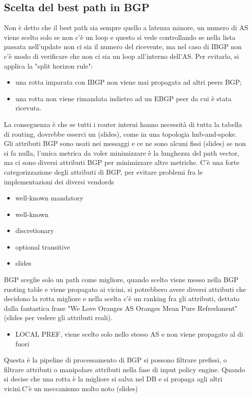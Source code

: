 \documentclass[12pt, oneside]{extbook} %
\begin{document}
\subsection{Scelta del best path in BGP}
Non è detto che il best path sia sempre quello a latenza minore, un numero di AS viene scelto solo se non c'è un loop e questo si vede controllando se nella lista passata nell'update non ci sia il numero del ricevente, ma nel caso di IBGP non c'è modo di verificare che non ci sia un loop all'interno dell'AS. Per evitarlo, si applica la "split horizon rule":
\begin{itemize}
\item una rotta imparata con IBGP non viene mai propagata ad altri peers BGP;
\item una rotta non viene rimandata indietro ad un EBGP peer da cui è stata ricevuta.
\end{itemize}
La conseguenza è che se tutti i router interni hanno necessità di tutta la tabella di routing, dovrebbe esserci un (slides), come in una topologia hub-and-spoke.\\Gli attributi BGP sono usati nei messaggi e ce ne sono alcuni fissi
(slides)
se non si fa nulla, l'unica metrica da voler minimizzare è la lunghezza del path vector, ma ci sono diversi attributi BGP per minimizzare altre metriche. C'è una forte categorizzazione degli attributi di BGP, per evitare problemi fra le implementazioni dei diversi vendords
\begin{itemize}
\item well-known mandatory
\item well-known
\item discretionary
\item optional transitive
\item slides
\end{itemize}
BGP sceglie solo un path come migliore, quando scelto viene messo nella BGP ruoting table e viene propagato ai vicini, si potrebbero avere diversi attributi che decidono la rotta migliore e nella scelta c'è un ranking fra gli attributi, dettato dalla fantastica frase "We Love Oranges AS Oranges Mean Pure Refreshment" (slides per vedere gli attributi reali).
\begin{itemize}
\item LOCAL PREF, viene scelto solo nello stesso AS e non viene propagato al di fuori
\end{itemize}
Questa è la pipeline di processamento di BGP
si possono filtrare prefissi, o filtrare attributi o manipolare attributi nella fase di input policy engine. Quando si decise che una rotta è la migliore si salva nel DB e si propaga agli altri vicini.C'è un meccanismo molto noto (slides)
\end{document}
